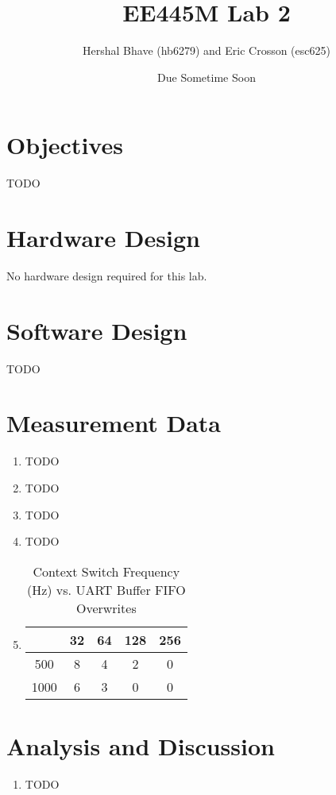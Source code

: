 \documentclass[12pt]{article}
\title{EE445M Lab 2}
\author{Hershal Bhave (hb6279) and Eric Crosson (esc625)}
\date{Due Sometime Soon}
\begin{document}
\maketitle

\section{Objectives}
{\huge \color{red} TODO}

\section{Hardware Design}
No hardware design required for this lab.

\section{Software Design}
{\huge \color{red} TODO}

\section{Measurement Data}
\begin{enumerate}
\item {\huge \color{red} TODO}
\item {\huge \color{red} TODO}
\item {\huge \color{red} TODO}
\item {\huge \color{red} TODO}
\item
  \begin{table}[h]
    \centering
    \begin{tabular}[H]{c|c|c|c|c}
           & 32 & 64 & 128 & 256 \\ \hline
      500  & 8  & 4  & 2   & 0   \\ \hline
      1000 & 6  & 3  & 0   & 0   \\ \hline
    \end{tabular}
    \caption{Context Switch Frequency (Hz) vs. UART Buffer FIFO Overwrites}
    \label{tab:fifo-perf}
  \end{table}

\end{enumerate}

\section{Analysis and Discussion}
\begin{enumerate}
\item {\huge \color{red} TODO}
\end{enumerate}
\end{document}
